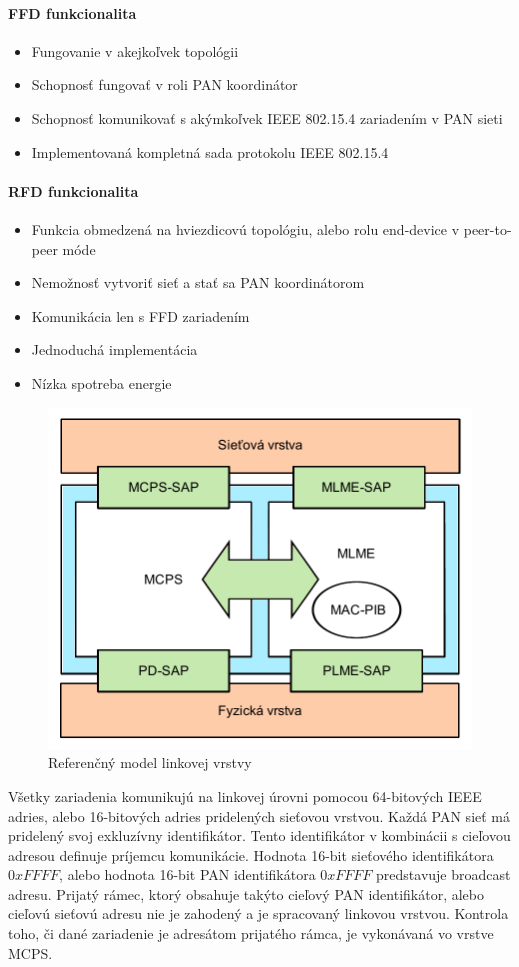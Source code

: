 \paragraph{FFD funkcionalita}
\begin{itemize}
\item Fungovanie v akejkoľvek topológii
\item Schopnosť fungovať v roli PAN koordinátor
\item Schopnosť komunikovať s akýmkoľvek IEEE 802.15.4 zariadením v PAN sieti
\item Implementovaná kompletná sada protokolu IEEE 802.15.4
\end{itemize}
\paragraph{RFD funkcionalita}
\begin{itemize}
\item Funkcia obmedzená na hviezdicovú topológiu, alebo rolu end-device v peer-to-peer móde
\item Nemožnosť vytvoriť sieť a stať sa PAN koordinátorom
\item Komunikácia len s FFD zariadením
\item Jednoduchá implementácia
\item Nízka spotreba energie
\end{itemize}
\begin{figure}[htbp]
\begin{center}
\includegraphics[width=120mm]{figures/topology_mac}
\caption{Referenčný model linkovej vrstvy}
\label{fig:topology_mac}
\end{center}
\end{figure}
\indent\indent Všetky zariadenia komunikujú na linkovej úrovni pomocou 64-bitových IEEE adries, alebo 16-bitových adries pridelených sieťovou vrstvou. Každá PAN sieť má pridelený svoj exkluzívny identifikátor. Tento identifikátor v kombinácii s cieľovou adresou definuje príjemcu komunikácie. Hodnota 16-bit sieťového identifikátora $0xFFFF$, alebo hodnota 16-bit PAN identifikátora $0xFFFF$ predstavuje broadcast adresu. Prijatý rámec, ktorý obsahuje takýto cieľový PAN identifikátor, alebo cieľovú sieťovú adresu nie je zahodený a je spracovaný linkovou vrstvou. Kontrola toho, či dané zariadenie je adresátom prijatého rámca, je vykonávaná vo vrstve MCPS.\\
